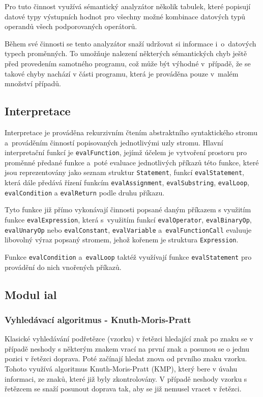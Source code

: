 \documentclass[12pt,a4paper,titlepage,final]{article}
\begin{document}
Pro tuto činnost využívá sémantický analyzátor několik tabulek, které 
popisují datové typy výstupních hodnot pro všechny možné kombinace 
datových typů operandů všech podporovaných operátorů. 

Během své činnosti se tento analyzátor snaží udržovat si informace 
i~o~datových typech proměnných. To umožňuje nalezení některých sémantických 
chyb ještě před provedením samotného programu, což může být výhodné 
v~případě, že se takové chyby nachází v části programu, která je prováděna 
pouze v~malém množství případů.
\subsection{Interpretace}
Interpretace je prováděna rekurzivním čtením abstraktního syntaktického stromu 
a~prováděním činností popisovaných jednotlivými uzly stromu. 
Hlavní interpretační funkcí je \texttt{evalFunction}, jejímž účelem je 
vytvoření prostoru pro proměnné předané funkce a~poté evaluace jednotlivých 
příkazů této funkce, které jsou reprezentovány jako seznam struktur \texttt{Statement}, 
funkcí \texttt{evalStatement}, která dále předává řízení funkcím 
\texttt{evalAssignment}, \texttt{evalSubstring}, \texttt{evalLoop}, 
\texttt{evalCondition} a \texttt{evalReturn} podle druhu příkazu. 

Tyto funkce již přímo vykonávají činnosti popsané daným příkazem 
s využitím funkce \texttt{evalExpression}, která s~využitím funkcí \texttt{evalOperator}, 
\texttt{evalBinaryOp}, \texttt{evalUnaryOp} nebo \texttt{evalConstant}, \texttt{evalVariable} 
a~\texttt{evalFunctionCall} evaluuje libovolný výraz popsaný stromem, 
jehož kořenem je struktura \texttt{Expression}. 

Funkce \texttt{evalCondition} a~\texttt{evalLoop} taktéž využívají funkce 
\texttt{evalStatement} pro provádění do nich vnořených příkazů.

\subsection{Modul ial}
\subsubsection{Vyhledávací algoritmus - Knuth-Moris-Pratt}
Klasické vyhledávání podřetězce (vzorku) v řetězci hledající znak po znaku se 
v případě neshody s některým znakem vrací na první znak a posunou se o jednu 
pozici v řetězci doprava. Poté začínají hledat znova od prvního znaku vzorku. 
Tohoto využívá algoritmus Knuth-Moris-Pratt (KMP), který bere v úvahu informaci, 
ze znaků, které již byly zkontrolovány. V případě neshody vzorku s řetězcem se 
snaží posunout doprava tak, aby se již nemusel vracet v řetězci. 
\end{document}
